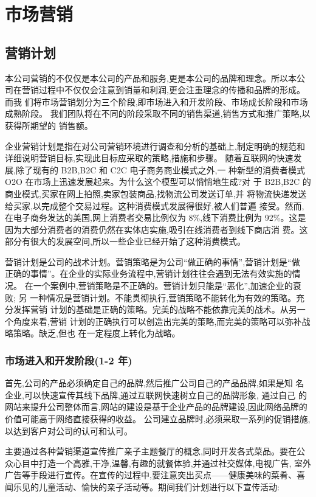 \chapter{市场营销}
\section{营销计划}
本公司营销的不仅仅是本公司的产品和服务,更是本公司的品牌和理念。所以本公
司在营销过程中不仅仅会注意到销量和利润,更会注重理念的传播和品牌的形成。而我
们将市场营销划分为三个阶段,即市场进入和开发阶段、市场成长阶段和市场成熟阶段。
我们团队将在不同的阶段采取不同的销售渠道,销售方式和推广策略,以获得所期望的
销售额。

企业营销计划是指在对公司营销环境进行调查和分析的基础上,制定明确的规范和
详细说明营销目标,实现此目标应采取的策略,措施和步骤。
随着互联网的快速发展,除了现有的 B2B,B2C 和 C2C 电子商务商业模式之外,一
种新型的消费者模式 O2O 在市场上迅速发展起来。为什么这个模型可以悄悄地生成?对
于 B2B,B2C 的商业模式,买家在网上拍照,卖家包装商品,找物流公司发送订单,并
将物流快递发送给买家,以完成整个交易过程。这种消费模式发展得很好,被人们普遍
接受。然而,在电子商务发达的美国,网上消费者交易比例仅为 8\%,线下消费比例为
92\%。这是因为大部分消费者的消费仍然在实体店实施,吸引在线消费者到线下商店消
费。这部分有很大的发展空间,所以一些企业已经开始了这种消费模式。

营销计划是公司的战术计划。营销策略是为公司“做正确的事情”,营销计划是“做
正确的事情”。在企业的实际业务流程中,营销计划往往会遇到无法有效实施的情况。
在一个案例中,营销策略是不正确的。营销计划只能是“恶化”,加速企业的衰败; 另
一种情况是营销计划。不能贯彻执行,营销策略不能转化为有效的策略。充分发挥营销
计划的基础是正确的策略。完美的战略不能依靠完美的战术。从另一个角度来看,营销
计划的正确执行可以创造出完美的策略,而完美的策略可以弥补战略策略。缺乏,但也
在一定程度上转化为战略。

\subsection{市场进入和开发阶段(1-2 年)}
首先,公司的产品必须确定自己的品牌,然后推广公司自己的产品品牌,如果是知
名企业,可以快速宣传其线下品牌,通过互联网快速树立自己的品牌形象, 通过自己
的网站来提升公司整体而言,网站的建设是基于企业产品的品牌建设,因此网络品牌的
价值可能高于网络直接获得的收益。 公司建立品牌时,必须采取一系列的促销措施,
以达到客户对公司的认可和认可。

主要通过各种营销渠道宣传推广亲子主题餐厅的概念,同时开发各式菜品。要在公
众心目中打造一个高雅,干净,温馨,有趣的就餐体验,并通过社交媒体,电视广告,
室外广告等手段进行宣传。在宣传的过程中,要注意突出买点——健康美味的菜肴、喜
闻乐见的儿童活动、愉快的亲子活动等。期间我们计划进行以下宣传活动:

